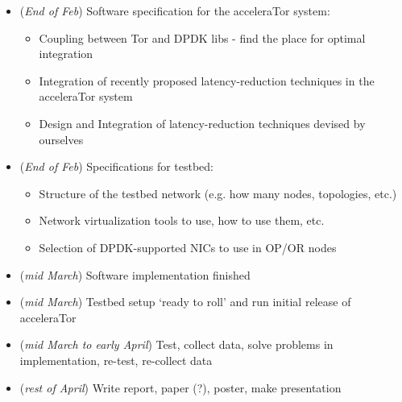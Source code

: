 \begin{itemize}

	\item (\textit{End of Feb}) Software specification for the acceleraTor system: 

	\begin{itemize}

		\item Coupling between Tor and DPDK libs - find the place for optimal 
		integration

		\item Integration of recently proposed latency-reduction techniques in 
		the acceleraTor system
		
		\item Design and Integration of latency-reduction techniques devised 
		by ourselves

	\end{itemize}

	\item (\textit{End of Feb}) Specifications for testbed:

	\begin{itemize}

		\item Structure of the testbed network (e.g. how many nodes, topologies, etc.)

		\item Network virtualization tools to use, how to use them, etc.

		\item Selection of DPDK-supported NICs to use in OP\slash OR nodes

	\end{itemize}

	\item (\textit{mid March}) Software implementation finished
	\item (\textit{mid March}) Testbed setup `ready to roll' and run initial release of 
		acceleraTor 
	\item (\textit{mid March to early April}) Test, collect data, solve problems in 
		implementation, re-test, re-collect data
	\item (\textit{rest of April}) Write report, paper (?), poster, make presentation

\end{itemize}

	
